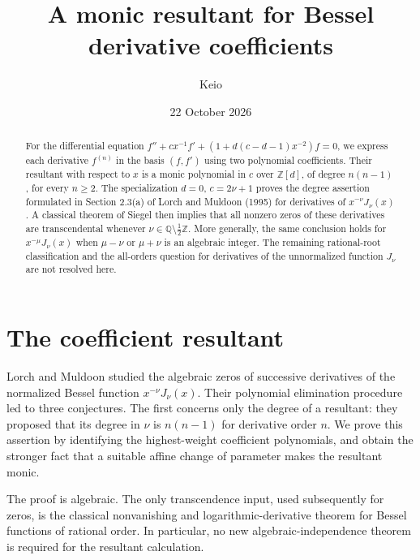 \documentclass[11pt]{article}
\title{A monic resultant for Bessel derivative coefficients}
\author{Keio}
\date{22 October 2026}
\newcommand{\Z}{\mathbb Z}
\newcommand{\Q}{\mathbb Q}
\begin{document}
\maketitle

\begin{abstract}
For the differential equation
$f''+cx^{-1}f'+(1+d(c-d-1)x^{-2})f=0$, we express each derivative
$f^{(n)}$ in the basis $(f,f')$ using two polynomial coefficients.
Their resultant with respect to $x$ is a monic polynomial in $c$ over
$\Z[d]$, of degree $n(n-1)$, for every $n\ge2$.
The specialization $d=0$, $c=2\nu+1$ proves the degree assertion
formulated in Section 2.3(a) of Lorch and Muldoon (1995) for derivatives
of $x^{-\nu}J_\nu(x)$. A classical theorem of Siegel then implies
that all nonzero zeros of these derivatives are transcendental whenever
$\nu\in\Q\setminus\tfrac12\Z$. More generally, the same conclusion
holds for $x^{-\mu}J_\nu(x)$ when $\mu-\nu$ or $\mu+\nu$ is an
algebraic integer. The remaining rational-root classification and the
all-orders question for derivatives of the unnormalized function
$J_\nu$ are not resolved here.
\end{abstract}

\section{The coefficient resultant}

Lorch and Muldoon \cite[Section 2.3]{LM95} studied the algebraic zeros
of successive derivatives of the normalized Bessel function
$x^{-\nu}J_\nu(x)$. Their polynomial elimination procedure led to
three conjectures. The first concerns only the degree of a resultant:
they proposed that its degree in $\nu$ is $n(n-1)$ for derivative
order $n$. We prove this assertion by identifying the highest-weight
coefficient polynomials, and obtain the stronger fact that a suitable
affine change of parameter makes the resultant monic.

The proof is algebraic. The only transcendence input, used subsequently
for zeros, is the classical nonvanishing and logarithmic-derivative
theorem for Bessel functions of rational order. In particular, no new
algebraic-independence theorem is required for the resultant calculation.
\end{document}
